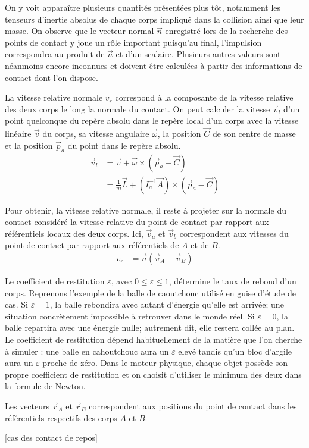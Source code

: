 On y voit apparaître plusieurs quantités présentées plus tôt,
notamment les tenseurs d'inertie absolus de chaque corps impliqué dans
la collision ainsi que leur masse. On observe que le vecteur normal
$\vec{n}$ enregistré lors de la recherche des points de contact y joue
un rôle important puisqu'au final, l'impulsion correspondra au produit
de $\vec{n}$ et d'un scalaire. Plusieurs autres valeurs sont néanmoins
encore inconnues et doivent être calculées à partir des informations
de contact dont l'on dispose.

La vitesse relative normale $v_r$ correspond à la composante de la
vitesse relative des deux corps le long la normale du contact. On peut
calculer la vitesse $\vec{v}_l$ d'un point quelconque du repère absolu
dans le repère local d'un corps avec la vitesse linéaire $\vec{v}$ du
corps, sa vitesse angulaire $\vec{\omega}$, la position $\vec{C}$ de
son centre de masse et la position $\vec{p}_a$ du point dans le repère
absolu.
\begin{align*}
  \vec{v}_l &= \vec{v} + \vec{\omega} \times (\vec{p}_a - \vec{C}) \\
            &= \frac{1}{m} \vec{L} + (I^{-1}_a \vec{A}) \times (\vec{p}_a - \vec{C})
\end{align*}

Pour obtenir, la vitesse relative normale, il reste à projeter sur la
normale du contact considéré la vitesse relative du point de contact
par rapport aux référentiels locaux des deux corps. Ici, $\vec{v}_a$
et $\vec{v}_b$ correspondent aux vitesses du point de contact par
rapport aux référentiels de $A$ et de $B$.
\begin{align*}
  v_r &= \vec{n} (\vec{v}_{A} - \vec{v}_{B})
\end{align*}

Le coefficient de restitution $\varepsilon$, avec $0 \leq \varepsilon
\leq 1$, détermine le taux de rebond d'un corps. Reprenons l'exemple
de la balle de caoutchouc utilisé en guise d'étude de cas. Si
$\varepsilon = 1$, la balle rebondira avec autant d'énergie qu'elle
est arrivée; une situation concrètement impossible à retrouver dans le
monde réel. Si $\varepsilon = 0$, la balle repartira avec une énergie
nulle; autrement dit, elle restera collée au plan. Le coefficient de
restitution dépend habituellement de la matière que l'on cherche à
simuler : une balle en cahoutchouc aura un $\varepsilon$ elevé tandis
qu'un bloc d'argile aura un $\varepsilon$ proche de zéro. Dans le
moteur physique, chaque objet possède son propre coefficient de
restitution et on choisit d'utiliser le minimum des deux dans la
formule de Newton.

Les vecteurs $\vec{r}_A$ et $\vec{r}_B$ correspondent aux positions du
point de contact dans les référentiels respectifs des corps $A$ et $B$.

[cas des contact de repos]
